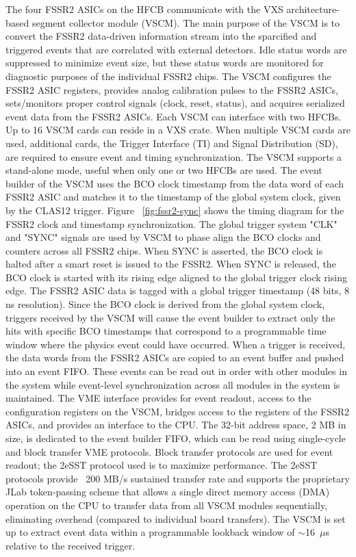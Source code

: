 The four FSSR2 ASICs on the HFCB communicate with the VXS architecture-based segment collector module (VSCM). The main purpose of the VSCM is to convert the FSSR2 data-driven information stream into the sparcified and triggered events that are correlated with external detectors. Idle status words are suppressed to minimize event size, but these status words are monitored for diagnostic purposes of the individual FSSR2 chips. The VSCM configures the FSSR2 ASIC registers, provides analog calibration pulses to the FSSR2 ASICs, sets/monitors proper control signals (clock, reset, status), and acquires serialized event data from the FSSR2 ASICs. Each VSCM can interface with two HFCBs. Up to 16 VSCM cards can reside in a VXS crate. When multiple VSCM cards are used, additional cards, the Trigger Interface (TI) and Signal Distribution (SD), are required to ensure event and timing synchronization. The VSCM supports a stand-alone mode, useful when only one or two HFCBs are used. The event builder of the VSCM uses the BCO clock timestamp from the data word of each FSSR2 ASIC and matches it to the timestamp of the global system clock, given by the CLAS12 trigger. Figure ~\ref{fig:fssr2-sync} shows the timing diagram for the FSSR2 clock and timestamp synchronization. The global trigger system "CLK" and "SYNC" signals are used by VSCM to phase align the BCO clocks  and counters across all FSSR2 chips. When SYNC is asserted, the BCO clock is halted after a smart reset is issued to the FSSR2. When SYNC is released, the BCO clock is started with its rising edge aligned to the global trigger clock rising edge. The FSSR2 ASIC data is tagged with a global trigger timestamp (48 bits, 8 ns resolution). Since the BCO clock is derived from the global system clock, triggers received by the VSCM will cause the event builder to extract only the hits with specific BCO timestamps that correspond to a programmable time window where the physics event could have occurred. When a trigger is received, the data words from the FSSR2 ASICs are copied to an event buffer and pushed into an event FIFO. These events can be read out in order with other modules in the system while event-level synchronization across all modules in the system is maintained. The VME interface provides for event readout, access to the configuration registers on the VSCM, bridges access to the registers of the FSSR2 ASICs, and provides an interface to the CPU. The 32-bit address space, 2 MB in size, is dedicated to the event builder FIFO, which can be read using single-cycle and block transfer VME protocols. Block transfer protocols are used for event readout; the 2eSST protocol used is to maximize performance. The 2eSST protocols provide ~200 MB/s sustained transfer rate and supports the proprietary JLab token-passing scheme that allows a single direct memory access (DMA) operation on the CPU to transfer data from all VSCM modules sequentially, eliminating overhead (compared to individual board transfers). The VSCM is set up to extract event data within a programmable lookback window of $\sim$16~$\mu$s relative to the received trigger. 

